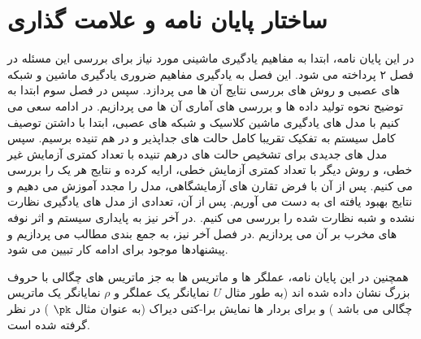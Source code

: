 \section{ساختار پایان نامه و علامت گذاری}





در این پایان نامه، ابتدا به مفاهیم یادگیری ماشینی مورد نیاز برای بررسی این مسئله در فصل ۲ پرداخته می شود. این فصل به یادگیری  مفاهیم ضروری یادگیری ماشین و شبکه های عصبی و روش های بررسی نتایج آن ها می پردازد.
سپس در فصل سوم ابتدا به توضیح نحوه تولید داده ها و بررسی های آماری آن ها می پردازیم. در ادامه سعی می کنیم با مدل های یادگیری ماشین کلاسیک و شبکه های عصبی، ابتدا با داشتن توصیف کامل سیستم به تفکیک تقریبا کامل حالت های جداپذیر و در هم تنیده برسیم. سپس مدل های جدیدی برای تشخیص حالت های درهم تنیده با تعداد کمتری آزمایش غیر خطی، و روش دیگر با تعداد کمتری آزمایش خطی، ارایه کرده و نتایج هر یک را بررسی می کنیم. پس از آن با فرض تقارن های آزمایشگاهی، مدل را مجدد آموزش می دهیم و نتایج بهبود یافته ای به دست می آوریم.
پس از آن، تعدادی از مدل های یادگیری نظارت نشده و شبه نظارت شده را بررسی می کنیم.
.در آخر نیز به پایداری سیستم و اثر نوفه های مخرب بر آن می پردازیم
.در فصل آخر نیز، به جمع بندی مطالب می پردازیم و پیشنهادها موجود برای ادامه کار تبیین می شود.

همچنین در این پایان نامه، عملگر ها و ماتریس ها به جز ماتریس های چگالی با حروف بزرگ نشان داده شده اند  (به طور مثال
$U$
نمایانگر یک عملگر و
$\rho$
نمایانگر یک ماتریس چگالی می باشد
) و
برای بردار ها نمایش برا-کتی دیراک (به عنوان مثال
$\pk$
) در نظر گرفته شده است.

